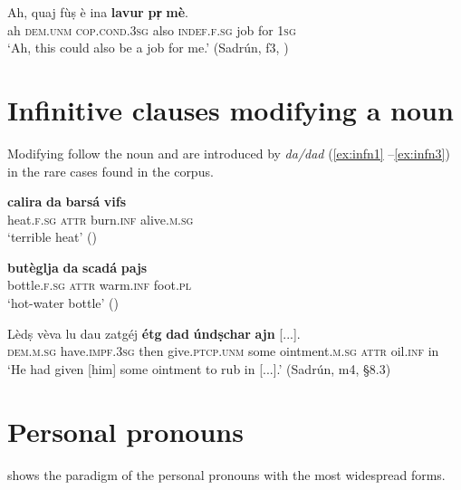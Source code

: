 \ea\label{ex:ppn4}
\gll Ah, quaj fùṣ è ina \textbf{lavur} \textbf{pr̩} \textbf{mè}.\\
	ah \textsc{dem.unm} \textsc{cop.cond.3sg} also \textsc{indef.f.sg} job for \textsc{1sg} \\
\glt `Ah, this could also be a job for me.' (Sadrún, f3, )
\z
\section{Infinitive clauses modifying a noun}\label{sec:3.5}
Modifying  follow the noun and are introduced by \textit{da/dad} (\ref{ex:infn1} --\ref{ex:infn3}) in the rare cases found in the corpus.

\ea\label{ex:infn1}

\gll  \textbf{calira} \textbf{da} \textbf{barsá} \textbf{vifs} \\
heat.\textsc{f.sg} \textsc{attr} burn.\textsc{inf} alive.\textsc{m.sg}\\
\glt `terrible heat' ()
\z

\ea\label{ex:infn2}
\gll   \textbf{butèglja} \textbf{da} \textbf{scadá} \textbf{pajs} \\
bottle.\textsc{f.sg} \textsc{attr} warm.\textsc{inf} foot.\textsc{pl} \\
\glt `hot-water bottle' ()
\z

\ea
\label{ex:infn3}
\gll  Lèdṣ vèva lu dau zatgéj \textbf{étg} \textbf{dad} \textbf{úndṣchar} \textbf{ajn} [...]. \\
\textsc{dem.m.sg} have.\textsc{impf.3sg} then  give.\textsc{ptcp.unm} some ointment.\textsc{m.sg} \textsc{attr} oil.\textsc{inf} in\\
\glt `He had given [him] some ointment to rub in [...].' (Sadrún, m4, §8.3)
\z



\section{Personal pronouns}\label{sec:3.6}
 shows the paradigm of the personal pronouns with the most widespread forms.

